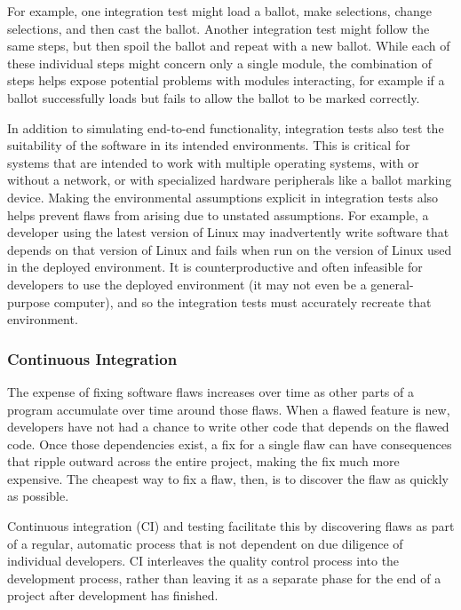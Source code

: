 For example, one integration test might load a ballot, make
selections, change selections, and then cast the ballot. Another
integration test might follow the same steps, but then spoil the
ballot and repeat with a new ballot. While each of these individual
steps might concern only a single module, the combination of steps
helps expose potential problems with modules interacting, for example
if a ballot successfully loads but fails to allow the ballot to be
marked correctly.

In addition to simulating end-to-end functionality, integration tests
also test the suitability of the software in its intended
environments. This is critical for systems that are intended to work
with multiple operating systems, with or without a network, or with
specialized hardware peripherals like a ballot marking device. Making
the environmental assumptions explicit in integration tests also helps
prevent flaws from arising due to unstated assumptions. For example, a
developer using the latest version of Linux may inadvertently write
software that depends on that version of Linux and fails when run on
the version of Linux used in the deployed environment. It is
counterproductive and often infeasible for developers to use the
deployed environment (it may not even be a general-purpose computer),
and so the integration tests must accurately recreate that
environment.

\subsubsection{Continuous Integration}

The expense of fixing software flaws increases over time as other
parts of a program accumulate over time around those flaws. When a
flawed feature is new, developers have not had a chance to write other
code that depends on the flawed code. Once those dependencies exist, a
fix for a single flaw can have consequences that ripple outward across
the entire project, making the fix much more expensive. The cheapest
way to fix a flaw, then, is to discover the flaw as quickly as
possible.

Continuous integration (CI) and testing facilitate this by discovering
flaws as part of a regular, automatic process that is not dependent on
due diligence of individual developers. CI interleaves the quality
control process into the development process, rather than leaving it
as a separate phase for the end of a project after development has
finished.

